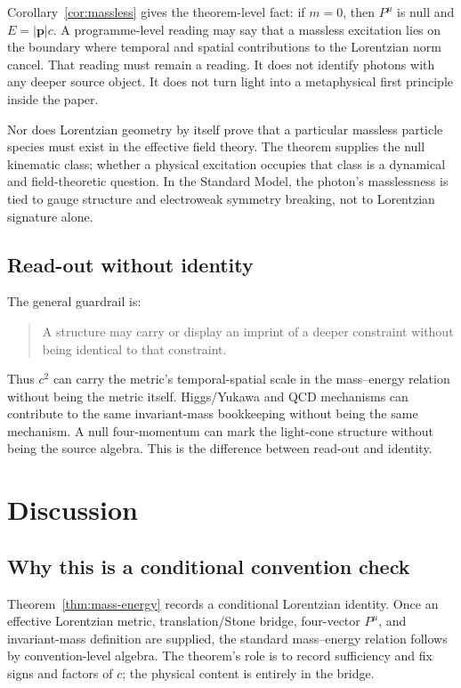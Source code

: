 \documentclass[12pt,a4paper]{article}
\theoremstyle{definition}
\theoremstyle{remark}
\begin{document}
Corollary~\ref{cor:massless} gives the theorem-level fact: if $m=0$, then $P^\mu$ is null and $E=|\mathbf p|c$. A programme-level reading may say that a massless excitation lies on the boundary where temporal and spatial contributions to the Lorentzian norm cancel. That reading must remain a reading. It does not identify photons with any deeper source object. It does not turn light into a metaphysical first principle inside the paper.

Nor does Lorentzian geometry by itself prove that a particular massless particle species must exist in the effective field theory. The theorem supplies the null kinematic class; whether a physical excitation occupies that class is a dynamical and field-theoretic question. In the Standard Model, the photon's masslessness is tied to gauge structure and electroweak symmetry breaking, not to Lorentzian signature alone.

\subsection{Read-out without identity}

The general guardrail is:

\begin{quote}
A structure may carry or display an imprint of a deeper constraint without being identical to that constraint.
\end{quote}

Thus $c^2$ can carry the metric's temporal-spatial scale in the mass--energy relation without being the metric itself. Higgs/Yukawa and QCD mechanisms can contribute to the same invariant-mass bookkeeping without being the same mechanism. A null four-momentum can mark the light-cone structure without being the source algebra. This is the difference between read-out and identity.

\section{Discussion}
\label{sec:discussion}

\subsection{Why this is a conditional convention check}

Theorem~\ref{thm:mass-energy} records a conditional Lorentzian identity.  Once an effective Lorentzian metric, translation/Stone bridge, four-vector $P^\mu$, and invariant-mass definition are supplied, the standard mass--energy relation follows by convention-level algebra.  The theorem's role is to record sufficiency and fix signs and factors of $c$; the physical content is entirely in the bridge.
\end{document}
